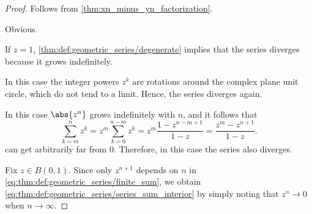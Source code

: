 \begin{proof}
   Follows from \cref{thm:xn_minus_yn_factorization}.

   Obvious.


   If \( z = 1 \), \cref{thm:def:geometric_series/degenerate} implies that the series diverges because it grows indefinitely.

   In this case the integer powers \( z^k \) are rotations around the complex plane unit circle, which do not tend to a limit. Hence, the series diverges again.

   In this case \( \abs{z^n} \) grows indefinitely with \( n \), and it follows that
  \begin{equation*}
    \sum_{k=m}^n z^k
    =
    z^m \sum_{k=0}^{n-m} z^k
    =
    z^m \frac {1 - z^{n-m+1}} {1 - z}
    =
    \frac {z^m - z^{n+1}} {1 - z}.
  \end{equation*}
  can get arbitrarily far from \( 0 \). Therefore, in this case the series also diverges.

   Fix \( z \in B(0, 1) \). Since only \( z^{n + 1} \) depends on \( n \) in \eqref{eq:thm:def:geometric_series/finite_sum}, we obtain \eqref{eq:thm:def:geometric_series/series_sum_interior} by simply noting that \( z^n \to 0 \) when \( n \to \infty \).
\end{proof}

